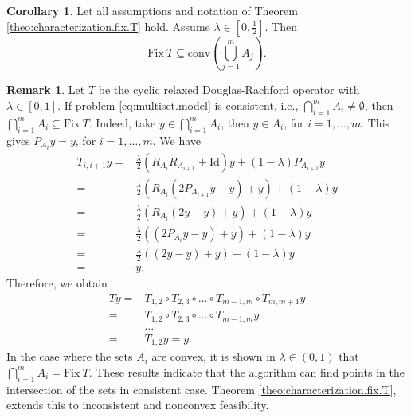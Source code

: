 \documentclass[12pt]{article}
\theoremstyle{definition}
\newtheorem{remark}{Remark}
\newtheorem{corollary}{Corollary}
\newcommand{\Id}{\mathrm{Id}}
\newcommand{\Fix}{\mathrm{Fix}\ }
\newcommand{\conv}{\mathrm{conv}}
\begin{document}
\begin{corollary}\label{coro:fixed.points.in.convexhull}
Let all assumptions and notation of Theorem \ref{theo:characterization.fix.T} hold.
Assume $\lambda\in[0,\frac{1}{2}]$.
Then
\begin{equation}
    \Fix T\subseteq \conv \left(\bigcup_{j=1}^m A_j\right).
\end{equation}
\end{corollary}
\begin{remark}\label{rem:intersection.subset.fixed.points}
Let $T$ be the cyclic relaxed Douglas-Rachford operator with $\lambda\in[0,1]$.
If problem \eqref{eq:multiset.model} is consistent, i.e., $\bigcap_{i=1}^m A_i\ne \emptyset$, then $\bigcap_{i=1}^m A_i \subseteq \Fix T$.
Indeed, take $y\in\bigcap_{i=1}^m A_i$, then  $y\in A_i$, for $i=1,\dots,m$. 
This gives $P_{A_i}y= y$, for $i=1,\dots,m$. We have 
\begin{equation*}
\begin{array}{rl}
    T_{i,i+1}y =&\frac{\lambda}{2}(R_{A_i}R_{A_{i+1}}+\Id)y+(1-\lambda)P_{A_{i+1}}y\\
    =&\frac{\lambda}{2}(R_{A_i}(2P_{A_{i+1}}y-y)+y)+(1-\lambda)y\\
    =&\frac{\lambda}{2}(R_{A_i}(2y-y)+y)+(1-\lambda)y\\
    =&\frac{\lambda}{2}((2P_{A_i}y-y)+y) + (1-\lambda)y\\
    =&\frac{\lambda}{2}((2y-y)+y) + (1-\lambda)y\\
    =&y.
    \end{array}
\end{equation*}
Therefore, we obtain
\begin{equation*}
\begin{array}{rl}
    Ty =& T_{1,2}\circ T_{2,3}\circ\dots \circ T_{m-1,m}\circ T_{m,m+1}y\\
    =&T_{1,2}\circ T_{2,3}\circ\dots \circ T_{m-1,m}y\\
    &\dots\\
    =&T_{1,2}y = y.
\end{array}
\end{equation*}
In the case where the sets $A_i$ are convex, it is shown in \cite[Proposition 1]{luke2018relaxed} $\lambda\in (0,1)$ that $\bigcap_{i=1}^m A_i = \Fix T$.
These results indicate that the algorithm can find points in the intersection of the sets in consistent case.
Theorem  \ref{theo:characterization.fix.T}, extends this to inconsistent and nonconvex feasibility.
\end{remark}
\end{document}
